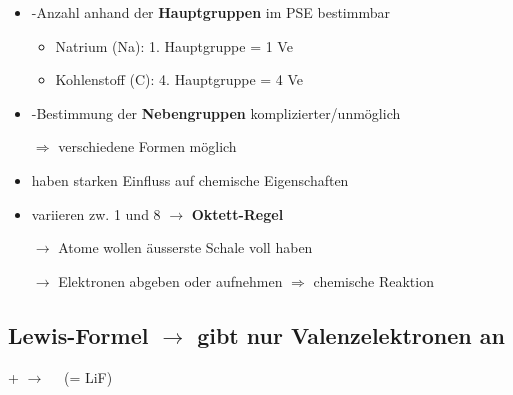 \begin{itemize}[itemsep=1pt, parsep=0pt]
    \item -Anzahl anhand der \textbf{Hauptgruppen} im PSE bestimmbar
    \begin{itemize}
        \item Natrium (Na): 1. Hauptgruppe = 1 Ve
        \item Kohlenstoff (C): 4. Hauptgruppe = 4 Ve 
    \end{itemize}
    \item -Bestimmung der \textbf{Nebengruppen} komplizierter/unmöglich 
    
        $\Rightarrow$ verschiedene Formen möglich

    \item haben starken Einfluss auf chemische Eigenschaften
    \item variieren zw. 1 und 8 $\rightarrow$ \textbf{Oktett-Regel}
    
        $\rightarrow$ Atome wollen äusserste Schale voll haben
        
        $\rightarrow$ Elektronen abgeben oder aufnehmen $\Rightarrow$ chemische Reaktion
\end{itemize}





\subsection{Lewis-Formel $\rightarrow$ gibt nur Valenzelektronen an}
\begin{center}
     +
    $\longrightarrow$
    $\quad$(= LiF)
\end{center}
